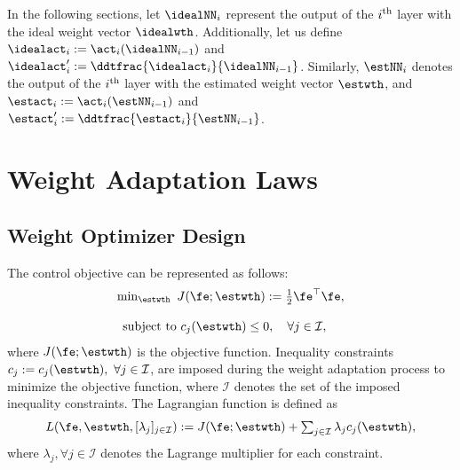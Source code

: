 \documentclass[journal]{IEEEtran}
\begin{document}
In the following sections, let $\idealNN_i$ represent the output of the $i\textsuperscript{th}$ layer with the ideal weight vector $\idealwth$. 
Additionally, let us define $\idealact_i:=\act_i(\idealNN_{i-1})$ and ${\idealact}'_i:= \ddtfrac{\idealact_i}{\idealNN_{i-1}}$. 
Similarly, $\estNN_i$ denotes the output of the $i\textsuperscript{th}$ layer with the estimated weight vector $\estwth$, and $\estact_i:=\act_i(\estNN_{i-1})$ and $\estact_i':= \ddtfrac{\estact_i}{\estNN_{i-1}}$.

\section{Weight Adaptation Laws}\label{sec:adap_laws}

\subsection{Weight Optimizer Design}\label{sec:sub:weight optimizer}

The control objective can be represented as follows:
\begin{equation}
    \begin{matrix}
        \min_{\estwth} \ J(\fe;\estwth):= 
        \tfrac{1}{2} \fe^\top \fe
        ,
        \\ \\
        \begin{aligned}
        \text{subject to }&c_{j}(\estwth) 
        \le0, \quad \forall j\in\mathcal{I},
        \end{aligned}
    \end{matrix}
    \label{eq:opt:problem1}
\end{equation}
where $J(\fe;\estwth)$ is the objective function.
Inequality constraints $c_j:=c_j(\estwth),\ \forall j\in\mathcal{I}$, are imposed during the weight adaptation process to minimize the objective function, where $\mathcal I$ denotes the set of the imposed inequality constraints. 
The Lagrangian function is defined as
\begin{equation}
    L(
        \fe,\estwth,[\lambda_j]_{j\in\mathcal I}
    ) 
    := 
    J(\fe;\estwth) 
    + 
    \textstyle\sum_{j\in\mathcal I}
    \lambda_{j}
    c_{j}(\estwth)
    ,
    \label{eq:lagrangian}
\end{equation}
where $\lambda_j,\forall j\in\mathcal{I}$ denotes the Lagrange multiplier for each constraint.
\end{document}
